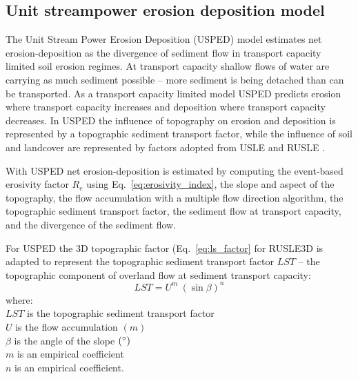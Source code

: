 \documentclass[esurf, manuscript]{copernicus}
\begin{document}
\subsection{Unit streampower erosion deposition model} \label{usped_model}
The Unit Stream Power Erosion Deposition (USPED) model 
estimates net erosion-deposition as the divergence of sediment flow
in transport capacity limited soil erosion regimes.
At transport capacity 
shallow flows of water are carrying as much sediment possible 
-- more sediment is being detached 
than can be transported.
As a transport capacity limited model
USPED predicts erosion where transport capacity increases
and deposition where transport capacity decreases. 
In USPED the influence of topography on erosion and deposition
is represented by a topographic sediment transport factor,
while the influence of soil and landcover are represented by 
factors adopted from USLE and RUSLE
\citep{Mitasova1996}.

With USPED net erosion-deposition is estimated by computing
the event-based erosivity factor $R_e$ using Eq.~\ref{eq:erosivity_index},
the slope and aspect of the topography,
the flow accumulation with a multiple flow direction algorithm,
the topographic sediment transport factor,
the sediment flow at transport capacity,
and the divergence of the sediment flow. 

For USPED
the 3D topographic factor (Eq.~\ref{eq:ls_factor} for RUSLE3D 
is adapted to represent the topographic sediment transport factor $LST$ --
the topographic component 
of overland flow at sediment transport capacity:
%
\begin{equation}
\label{eq:lst_factor}
{LST = U^{m} ~ (\sin \beta)^{n}}
\end{equation}
%
{\small
\noindent
where: \\
\noindent
\hspace*{0.5em} $LST$ is the topographic sediment transport factor\\
\hspace*{0.5em} $U$ is the flow accumulation $(m)$\\
\hspace*{0.5em} $\beta$ is the angle of the slope $(^{\circ})$\\
\hspace*{0.5em} $m$ is an empirical coefficient\\
\hspace*{0.5em} $n$ is an empirical coefficient.\\
}
\end{document}
